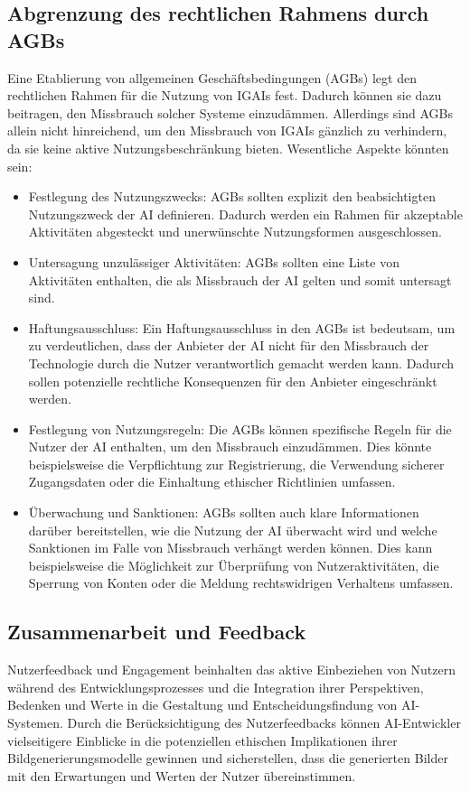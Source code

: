 \documentclass[12pt]{report}
\begin{document}
\subsection{Abgrenzung des rechtlichen Rahmens durch {AGB}s}
Eine Etablierung von allgemeinen Geschäftsbedingungen (AGBs) legt den rechtlichen Rahmen für die Nutzung von IGAIs fest. Dadurch können sie dazu beitragen, den Missbrauch solcher Systeme einzudämmen. 
Allerdings sind AGBs allein nicht hinreichend, um den Missbrauch von IGAIs gänzlich zu verhindern, da sie keine aktive Nutzungsbeschränkung bieten. Wesentliche Aspekte könnten sein:
\begin{itemize}
    \item Festlegung des Nutzungszwecks: AGBs sollten explizit den beabsichtigten Nutzungszweck der AI definieren. Dadurch werden ein Rahmen für akzeptable Aktivitäten abgesteckt und unerwünschte Nutzungsformen ausgeschlossen.
    \item Untersagung unzulässiger Aktivitäten: AGBs sollten eine Liste von Aktivitäten enthalten, die als Missbrauch der AI gelten und somit untersagt sind.
    \item Haftungsausschluss: Ein Haftungsausschluss in den AGBs ist bedeutsam, um zu verdeutlichen, dass der Anbieter der AI nicht für den Missbrauch der Technologie durch die Nutzer verantwortlich gemacht werden kann. Dadurch sollen potenzielle rechtliche Konsequenzen für den Anbieter eingeschränkt werden.
    \item Festlegung von Nutzungsregeln: Die AGBs  können spezifische Regeln für die Nutzer der AI enthalten, um den Missbrauch einzudämmen. Dies könnte beispielsweise die Verpflichtung zur Registrierung, die Verwendung sicherer Zugangsdaten oder die Einhaltung ethischer Richtlinien umfassen.
    \item Überwachung und Sanktionen: AGBs sollten auch klare Informationen darüber bereitstellen, wie die Nutzung der AI überwacht wird und welche Sanktionen im Falle von Missbrauch verhängt werden können. Dies kann beispielsweise die Möglichkeit zur Überprüfung von Nutzeraktivitäten, die Sperrung von Konten oder die Meldung rechtswidrigen Verhaltens umfassen.
\end{itemize}

\subsection{Zusammenarbeit und Feedback}
Nutzerfeedback und Engagement beinhalten das aktive Einbeziehen von Nutzern während des Entwicklungsprozesses und die Integration ihrer Perspektiven, Bedenken und Werte in die Gestaltung und Entscheidungsfindung von AI-Systemen. Durch die Berücksichtigung des Nutzerfeedbacks können AI-Entwickler vielseitigere Einblicke in die potenziellen ethischen Implikationen ihrer Bildgenerierungsmodelle gewinnen und sicherstellen, dass die generierten Bilder mit den Erwartungen und Werten der Nutzer übereinstimmen.
\end{document}
